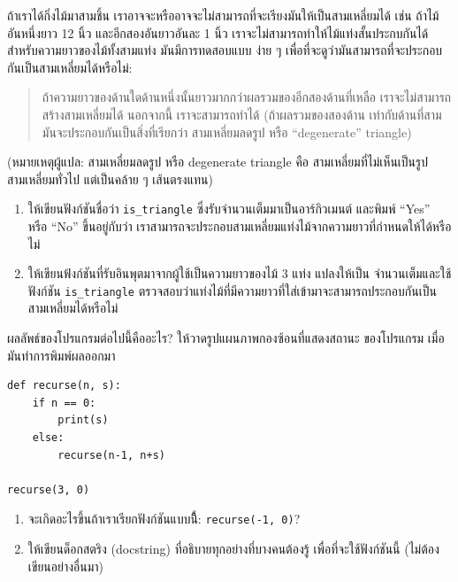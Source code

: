 \begin{exercise}

ถ้าเราได้กิ่งไม้มาสามชิ้น เราอาจจะหรืออาจจะไม่สามารถที่จะเรียงมันให้เป็นสามเหลี่ยมได้ เช่น ถ้าไม้อันหนึ่งยาว 12 นิ้ว และอีกสองอันยาวอันละ 1 นิ้ว เราจะไม่สามารถทำให้ไม้แท่งสั้นประกบกันได้ สำหรับความยาวของไม้ทั้งสามแท่ง มันมีการทดสอบแบบ
ง่าย ๆ เพื่อที่จะดูว่ามันสามารถที่จะประกอบกันเป็นสามเหลี่ยมได้หรือไม่:

\begin{quotation}
ถ้าความยาวของด้านใดด้านหนึ่งนั้นยาวมากกว่าผลรวมของอีกสองด้านที่เหลือ 
เราจะไม่สามารถสร้างสามเหลี่ยมได้ นอกจากนี้ เราจะสามารถทำได้ 
(ถ้าผลรวมของสองด้าน เท่ากับด้านที่สาม มันจะประกอบกันเป็นสิ่งที่เรียกว่า 
สามเหลี่ยมลดรูป หรือ ``degenerate'' triangle)
\end{quotation}

(หมายเหตุผู้แปล: สามเหลี่ยมลดรูป หรือ degenerate triangle คือ 
สามเหลี่ยมที่ไม่เห็นเป็นรูปสามเหลี่ยมทั่วไป แต่เป็นคล้าย ๆ เส้นตรงแทน)

\begin{enumerate}

\item ให้เขียนฟังก์ชันชื่อว่า \verb"is_triangle" ซึ่งรับจำนวนเต็มมาเป็นอาร์กิวเมนต์ 
และพิมพ์ ``Yes'' หรือ ``No'' ขึ้นอยู่กับว่า
เราสามารถจะประกอบสามเหลี่ยมแท่งไม้จากความยาวที่กำหนดให้ได้หรือไม่ 

\item ให้เขียนฟ้งก์ชันที่รับอินพุตมาจากผู้ใช้เป็นความยาวของไม้ 3 แท่ง แปลงให้เป็น
จำนวนเต็มและใช้ฟังก์ชัน \verb"is_triangle" 
ตรวจสอบว่าแท่งไม้ที่มีความยาวที่ใส่เข้ามาจะสามารถประกอบกันเป็นสามเหลี่ยมได้หรือไม่

\end{enumerate}

\end{exercise}

\begin{exercise}
ผลลัพธ์ของโปรแกรมต่อไปนี้คืออะไร? ให้วาดรูปแผนภาพกองซ้อนที่แสดงสถานะ 
ของโปรแกรม เมื่อมันทำการพิมพ์ผลออกมา

\begin{verbatim}
def recurse(n, s):
    if n == 0:
        print(s)
    else:
        recurse(n-1, n+s)

recurse(3, 0)
\end{verbatim}

\begin{enumerate}

\item จะเกิดอะไรขึ้นถ้าเราเรียกฟังก์ชันแบบนี้ีี: {\tt   recurse(-1, 0)}?

\item ให้เขียนด็อกสตริง (docstring) ที่อธิบายทุกอย่างที่บางคนต้องรู้
เพื่อที่จะใช้ฟังก์ชันนี้ (ไม่ต้องเขียนอย่างอื่นมา)

\end{enumerate}

\end{exercise}


